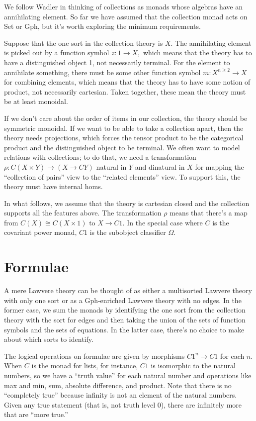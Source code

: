\documentclass[sigplan,9pt,review,anonymous]{acmart}\settopmatter{printfolios=true,printccs=false,printacmref=false}
\newcommand{\maps}{\colon}
\begin{document}
We follow Wadler \cite{Wadler} in thinking of collections as monads whose algebras have an annihilating element.  So far we have assumed that the collection monad acts on Set or Gph, but it's worth exploring the minimum requirements.  

Suppose that the one sort in the collection theory is $X.$  The annihilating element is picked out by a function symbol ${z\maps 1 \to X,}$ which means that the theory has to have a distinguished object 1, not necessarily terminal.  For the element to annihilate something, there must be some other function symbol ${m\maps X^{n \ge 2} \to X}$ for combining elements, which means that the theory has to have some notion of product, not necessarily cartesian.  Taken together, these mean the theory must be at least monoidal.  

If we don't care about the order of items in our collection, the theory should be symmetric monoidal.  If we want to be able to take a collection apart, then the theory needs projections, which forces the tensor product to be the categorical product and the distinguished object to be terminal.  We often want to model relations with collections; to do that, we need a transformation ${\rho\maps C(X\times Y) \to (X \to CY)}$ natural in $Y$ and dinatural in $X$ for mapping the ``collection of pairs'' view to the ``related elements'' view.  To support this, the theory must have internal homs.  

In what follows, we assume that the theory is cartesian closed and the collection supports all the features above.  The transformation $\rho$ means that there's a map from ${C(X)\cong C(X \times 1)}$ to ${X \to C1.}$  In the special case where $C$ is the covariant power monad, $C1$ is the subobject classifier $\Omega.$

\section{Formulae}

A mere Lawvere theory can be thought of as either a multisorted Lawvere theory with only one sort or as a Gph-enriched Lawvere theory with no edges.  In the former case, we sum the monads by identifying the one sort from the collection theory with the sort for edges and then taking the union of the sets of function symbols and the sets of equations.  In the latter case, there's no choice to make about which sorts to identify.

The logical operations on formulae are given by morphisms $C1^n \to C1$ for each $n.$  When $C$ is the monad for lists, for instance, $C1$ is isomorphic to the natural numbers, so we have a ``truth value'' for each natural number and operations like max and min, sum, absolute difference, and product.  Note that there is no ``completely true'' because infinity is not an element of the natural numbers.  Given any true statement (that is, not truth level 0), there are infinitely more that are ``more true.''
\end{document}
